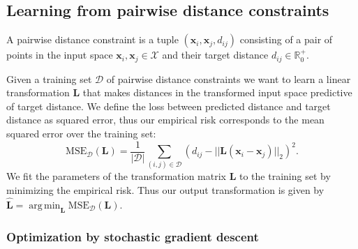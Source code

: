 \documentclass[a4paper,titlepage]{article}
\renewcommand{\vec}[1]{\mathbf{#1}}
\newcommand{\mat}[1]{\mathbf{#1}}
\DeclareMathOperator*{\argmin}{arg\,min}
\begin{document}
\subsection{Learning from pairwise distance constraints}


A pairwise distance constraint is a tuple $(\vec{x}_i, \vec{x}_j, d_{ij})$ consisting of a pair of points in the input space $\vec{x}_i, \vec{x}_j \in \mathcal{X}$ and their target distance $d_{ij} \in \mathbb{R}_0^+$. 

Given a training set $\mathcal{D}$ of pairwise distance constraints we want to learn a linear transformation $\mat{L}$ that makes distances in the transformed input space predictive of target distance. We define the loss between predicted distance and target distance as squared error, thus our empirical risk corresponds to the mean squared error over the training set:
\begin{equation}
\text{MSE}_\mathcal{D}(\mat{L}) = \frac{1}{|\mathcal{D}|}\sum_{(i,j) \in \mathcal{D}} \left ( d_{ij} - ||\mat{L} (\vec{x}_i - \vec{x}_j)||_2 \right)^2.
\label{eq:mse}
\end{equation}
We fit the parameters of the transformation matrix $\mat{L}$ to the training set by minimizing the empirical risk. Thus our output transformation is given by $\hat{\mat{L}} = \argmin_{\mat{L}} \text{MSE}_\mathcal{D}(\mat{L})$. 

\subsubsection{Optimization by stochastic gradient descent}
\end{document}

